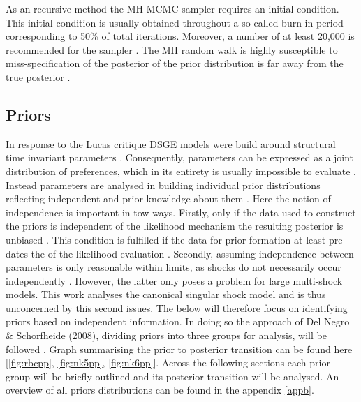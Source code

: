 \documentclass[12pt,a4paper,english]{article} %
\begin{document}
	As an recursive method the MH-MCMC sampler requires an initial condition. This initial condition is usually obtained throughout a so-called burn-in period corresponding to 50\% of total iterations. Moreover, a number of at least 20,000 is recommended for the sampler \cite{herbst_bayesian_2016}.
	The MH random walk is highly susceptible to miss-specification of the posterior of the prior distribution is far away from the true posterior \cite{herbst_bayesian_2016}.
			
	\subsection{Priors} \label{priors}
	In response to the Lucas critique \ac{DSGE} models were build around structural time invariant parameters \cite{lucas_jr_tobin_1981}. Consequently, parameters can be expressed as a joint distribution of preferences, which in its entirety is usually impossible to evaluate \cite{del_negro_forming_2008}. Instead parameters are analysed in building individual prior distributions reflecting independent and prior knowledge about them \cite{del_negro_forming_2008}. Here the notion of independence is important in tow ways. Firstly, only if the data used to construct the priors is independent of the likelihood mechanism the resulting posterior is unbiased \cite{del_negro_forming_2008}. This condition is fulfilled if the data for prior formation at least pre-dates the of the likelihood evaluation \cite{herbst_bayesian_2016}. Secondly, assuming independence between parameters is only reasonable within limits, as shocks do not necessarily occur independently \cite{herbst_bayesian_2016}. However, the latter only poses a problem for large multi-shock models. This work analyses the canonical singular shock model and is thus unconcerned by this second issues. The below will therefore focus on identifying priors based on independent information. In doing so the approach of Del Negro \& Schorfheide (2008), dividing priors into three groups for analysis, will be followed \cite{del_negro_forming_2008}. Graph summarising the prior to posterior transition can be found here [\ref{fig:rbcpp}, \ref{fig:nk5pp}, \ref{fig:nk6pp}]. Across the following sections each prior group will be briefly outlined and its posterior transition will be analysed. An overview of all priors distributions can be found in the appendix \ref{appb}. 
	
\end{document}
